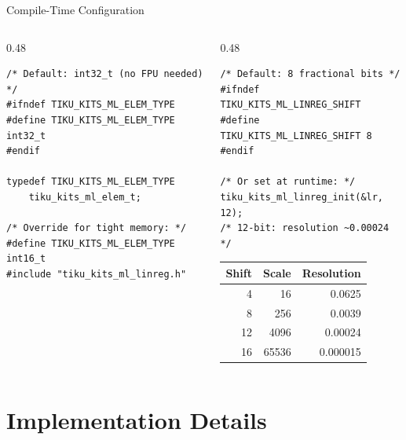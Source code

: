\documentclass[aspectratio=169, 10pt]{beamer}
\begin{document}
\begin{frame}[fragile]{Compile-Time Configuration}
\begin{columns}[T]
\begin{column}{0.48\textwidth}
\begin{lstlisting}[style=cstyle,
  title={Configurable element type}]
/* Default: int32_t (no FPU needed) */
#ifndef TIKU_KITS_ML_ELEM_TYPE
#define TIKU_KITS_ML_ELEM_TYPE int32_t
#endif

typedef TIKU_KITS_ML_ELEM_TYPE
    tiku_kits_ml_elem_t;

/* Override for tight memory: */
#define TIKU_KITS_ML_ELEM_TYPE int16_t
#include "tiku_kits_ml_linreg.h"
\end{lstlisting}
\end{column}

\begin{column}{0.48\textwidth}
\begin{lstlisting}[style=cstyle,
  title={Configurable Q-format precision}]
/* Default: 8 fractional bits */
#ifndef TIKU_KITS_ML_LINREG_SHIFT
#define TIKU_KITS_ML_LINREG_SHIFT 8
#endif

/* Or set at runtime: */
tiku_kits_ml_linreg_init(&lr, 12);
/* 12-bit: resolution ~0.00024 */
\end{lstlisting}

\vspace{0.3em}
\begin{table}
\centering
\scriptsize
\begin{tabular}{@{}rrr@{}}
\toprule
\textbf{Shift} & \textbf{Scale} & \textbf{Resolution} \\
\midrule
4  & 16     & 0.0625 \\
8  & 256    & 0.0039 \\
12 & 4096   & 0.00024 \\
16 & 65536  & 0.000015 \\
\bottomrule
\end{tabular}
\end{table}
\end{column}
\end{columns}
\end{frame}

\section{Implementation Details}
\end{document}
